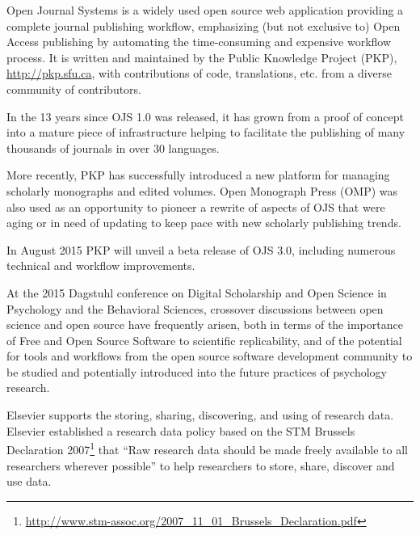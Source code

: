 \documentclass[a4paper,USenglish]{dagrep}
\begin{document}
{}
\license
Open Journal Systems is a widely used open source web application providing a
complete journal publishing workflow, emphasizing (but not exclusive to) Open
Access publishing by automating the time-consuming and expensive workflow
process. It is written and maintained by the Public Knowledge Project (PKP),
\url{http://pkp.sfu.ca}, with contributions of code, translations, etc. from a
diverse community of contributors.

In the 13 years since OJS 1.0 was released, it has grown from a proof of concept
into a mature piece of infrastructure helping to facilitate the publishing of
many thousands of journals in over 30 languages.

More recently, PKP has successfully introduced a new platform for managing
scholarly monographs and edited volumes. Open Monograph Press (OMP) was also
used as an opportunity to pioneer a rewrite of aspects of OJS that were aging or
in need of updating to keep pace with new scholarly publishing trends.

In August 2015 PKP will unveil a beta release of OJS 3.0, including numerous
technical and workflow improvements.

At the 2015 Dagstuhl conference on Digital Scholarship and Open Science in
Psychology and the Behavioral Sciences, crossover discussions between open
science and open source have frequently arisen, both in terms of the importance
of Free and Open Source Software to scientific replicability, and of the
potential for tools and workflows from the open source software development
community to be studied and potentially introduced into the future practices of
psychology research.


{}
\license
Elsevier supports the storing, sharing, discovering, and using of research data. Elsevier established a research data policy based on the STM Brussels Declaration 2007\footnote{\url{http://www.stm-assoc.org/2007_11_01_Brussels_Declaration.pdf}} that “Raw research data should be made freely available to all researchers wherever possible” to help researchers to store, share, discover and use data.
\end{document}
